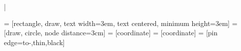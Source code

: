 |\documentclass[journal,12pt,twocolumn]{IEEEtran}
\DeclareMathOperator*{\Res}{Res}
\begin{document}
%
 = [rectangle, draw,
    text width=3em, text centered, minimum height=3em]
 = [draw, circle, node distance=3cm]
 = [coordinate]
 = [coordinate]
 = [pin edge={to-,thin,black}]

\theoremstyle{definition}
\newtheorem{theorem}{Theorem}[section]
\newtheorem{problem}{Problem}
\newtheorem{proposition}{Proposition}[section]
\newtheorem{lemma}{Lemma}[section]
\newtheorem{corollary}[theorem]{Corollary}
\newtheorem{example}{Example}[section]
\newtheorem{definition}{Definition}[section]
\newcommand{\BEQA}{\begin{eqnarray}}
\newcommand{\EEQA}{\end{eqnarray}}
\newcommand{\define}{\stackrel{\triangle}{=}}


%

\providecommand{\nCr}[2]{\,^{#1}C_{#2}} %
\providecommand{\nPr}[2]{\,^{#1}P_{#2}} %
\providecommand{\mbf}{\mathbf}
\providecommand{\pr}[1]{\ensuremath{\Pr\left(#1\right)}}
\providecommand{\qfunc}[1]{\ensuremath{Q\left(#1\right)}}
\providecommand{\sbrak}[1]{\ensuremath{{}\left[#1\right]}}
\providecommand{\lsbrak}[1]{\ensuremath{{}\left[#1\right.}}
\providecommand{\rsbrak}[1]{\ensuremath{{}\left.#1\right]}}
\providecommand{\brak}[1]{\ensuremath{\left(#1\right)}}
\providecommand{\lbrak}[1]{\ensuremath{\left(#1\right.}}
\providecommand{\rbrak}[1]{\ensuremath{\left.#1\right)}}
\providecommand{\cbrak}[1]{\ensuremath{\left\{#1\right\}}}
\providecommand{\lcbrak}[1]{\ensuremath{\left\{#1\right.}}
\providecommand{\rcbrak}[1]{\ensuremath{\left.#1\right\}}}
\theoremstyle{remark}
\newtheorem{rem}{Remark}
\newcommand{\sgn}{\mathop{\mathrm{sgn}}}
\providecommand{\abs}[1]{\left\vert#1\right\vert}
\providecommand{\res}[1]{\Res\displaylimits_{#1}} 
\providecommand{\norm}[1]{\lVert#1\rVert}
\providecommand{\mtx}[1]{\mathbf{#1}}
\providecommand{\mean}[1]{E\left[ #1 \right]}
\providecommand{\fourier}{\overset{\mathcal{F}}{ \rightleftharpoons}}
\providecommand{\system}{\overset{\mathcal{H}}{ \longleftrightarrow}}
\newcommand{\solution}{\noindent \textbf{Solution: }}
\providecommand{\dec}[2]{\ensuremath{\overset{#1}{\underset{#2}{\gtrless}}}}
\DeclarePairedDelimiter{\ceil}{\lceil}{\rceil}
\makeatletter
{}
\makeatother
\end{document}
